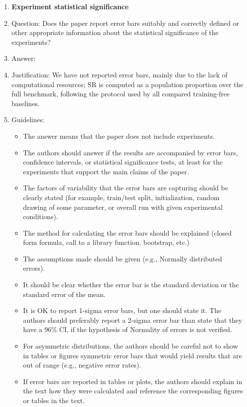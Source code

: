 \begin{enumerate}
\item {\bf Experiment statistical significance}
    \item[] Question: Does the paper report error bars suitably and correctly defined or other appropriate information about the statistical significance of the experiments?
    \item[] Answer: \answerNo{}
    \item[] Justification: We have not reported error bars, mainly due to the lack of computational resources; SR is computed as a population proportion over the full benchmark, following the protocol used by all compared training-free baselines.
    \item[] Guidelines:
    \begin{itemize}
        \item The answer \answerNA{} means that the paper does not include experiments.
        \item The authors should answer \answerYes{} if the results are accompanied by error bars, confidence intervals, or statistical significance tests, at least for the experiments that support the main claims of the paper.
        \item The factors of variability that the error bars are capturing should be clearly stated (for example, train/test split, initialization, random drawing of some parameter, or overall run with given experimental conditions).
        \item The method for calculating the error bars should be explained (closed form formula, call to a library function, bootstrap, etc.)
        \item The assumptions made should be given (e.g., Normally distributed errors).
        \item It should be clear whether the error bar is the standard deviation or the standard error of the mean.
        \item It is OK to report 1-sigma error bars, but one should state it. The authors should preferably report a 2-sigma error bar than state that they have a 96\% CI, if the hypothesis of Normality of errors is not verified.
        \item For asymmetric distributions, the authors should be careful not to show in tables or figures symmetric error bars that would yield results that are out of range (e.g., negative error rates).
        \item If error bars are reported in tables or plots, the authors should explain in the text how they were calculated and reference the corresponding figures or tables in the text.
    \end{itemize}


\end{enumerate}
